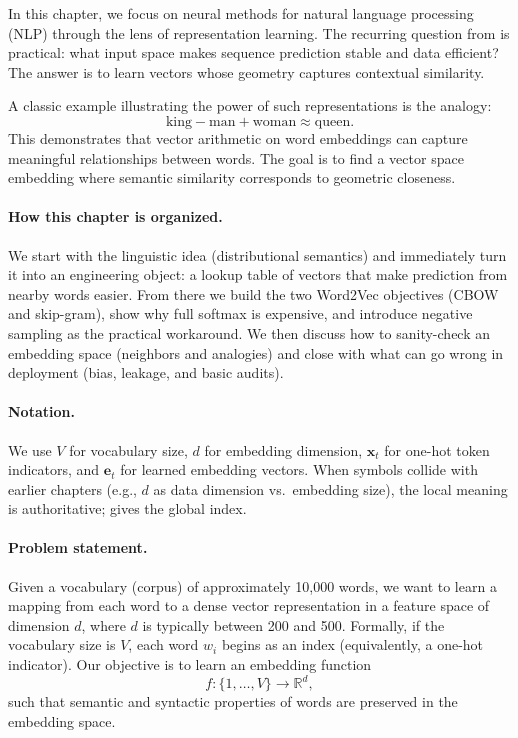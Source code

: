 In this chapter, we focus on neural methods for natural language processing (NLP) through the lens of representation learning. The recurring question from  is practical: what input space makes sequence prediction stable and data efficient? The answer is to learn vectors whose geometry captures contextual similarity.

A classic example illustrating the power of such representations is the analogy:
\[
\text{king} - \text{man} + \text{woman} \approx \text{queen}.
\]
This demonstrates that vector arithmetic on word embeddings can capture meaningful relationships between words. The goal is to find a vector space embedding where semantic similarity corresponds to geometric closeness.

\paragraph{How this chapter is organized.}
We start with the linguistic idea (distributional semantics) and immediately turn it into an engineering object: a lookup table of vectors that make prediction from nearby words easier. From there we build the two Word2Vec objectives (CBOW and skip-gram), show why full softmax is expensive, and introduce negative sampling as the practical workaround. We then discuss how to sanity-check an embedding space (neighbors and analogies) and close with what can go wrong in deployment (bias, leakage, and basic audits).

\paragraph{Notation.}
We use \(V\) for vocabulary size, \(d\) for embedding dimension, \(\mathbf{x}_t\) for one-hot token indicators, and \(\mathbf{e}_t\) for learned embedding vectors. When symbols collide with earlier chapters (e.g., \(d\) as data dimension vs.\ embedding size), the local meaning is authoritative;  gives the global index.

\paragraph{Problem statement.}\label{sec:nlp_problem_statement}
Given a vocabulary (corpus) of approximately 10,000 words, we want to learn a mapping from each word to a dense vector representation in a feature space of dimension \(d\), where \(d\) is typically between 200 and 500. Formally, if the vocabulary size is \(V\), each word \(w_i\) begins as an index (equivalently, a one-hot indicator). Our objective is to learn an embedding function
\[
f: \{1, \ldots, V\} \to \mathbb{R}^d,
\]
such that semantic and syntactic properties of words are preserved in the embedding space.

